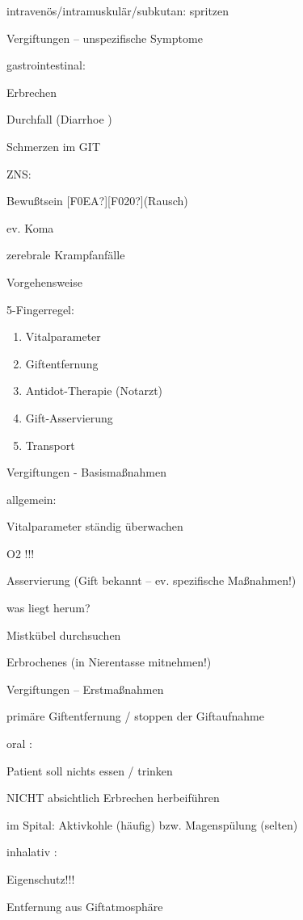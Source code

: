 \documentclass{article}
\begin{document}
intraven\"os/intramuskul\"ar/subkutan: spritzen

Vergiftungen -- unspezifische  Symptome

gastrointestinal:

Erbrechen

Durchfall (Diarrhoe )

Schmerzen im GIT

ZNS:

Bewu{\ss}tsein [F0EA?][F020?](Rausch)

ev. Koma

zerebrale Krampfanf\"alle

Vorgehensweise

5-Fingerregel:

\begin{enumerate}
\item Vitalparameter

\item Giftentfernung

\item Antidot-Therapie (Notarzt)

\item Gift-Asservierung

\item Transport

\end{enumerate}
Vergiftungen - Basisma{\ss}nahmen

allgemein:

Vitalparameter st\"andig \"uberwachen

O2  !!!

Asservierung (Gift bekannt -- ev. spezifische  Ma{\ss}nahmen!)

was liegt herum?

Mistk\"ubel durchsuchen

Erbrochenes (in Nierentasse mitnehmen!)

Vergiftungen -- Erstma{\ss}nahmen

prim\"are Giftentfernung / stoppen der Giftaufnahme

oral : 

Patient soll nichts essen / trinken

NICHT absichtlich Erbrechen herbeif\"uhren

im Spital: Aktivkohle (h\"aufig) bzw.  Magensp\"ulung (selten)

inhalativ :

Eigenschutz!!!

Entfernung aus Giftatmosph\"are
\end{document}
